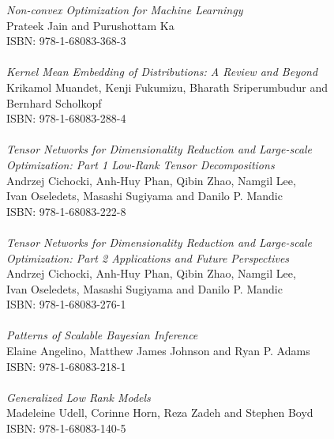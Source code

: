 \vspace{12pt}
\noindent \textit{Non-convex Optimization for Machine Learningy}\\
Prateek Jain and Purushottam Ka\\
ISBN: 978-1-68083-368-3\\
\\
\noindent \textit{Kernel Mean Embedding of Distributions: A Review and Beyond}\\
Krikamol Muandet, Kenji Fukumizu, Bharath Sriperumbudur and\\ Bernhard Scholkopf\\
ISBN: 978-1-68083-288-4\\
\\
\noindent \textit{Tensor Networks for Dimensionality Reduction and Large-scale\\ Optimization: Part 1 Low-Rank Tensor Decompositions}\\
Andrzej Cichocki, Anh-Huy Phan, Qibin Zhao, Namgil Lee,\\ Ivan Oseledets, Masashi Sugiyama and Danilo P. Mandic\\
ISBN: 978-1-68083-222-8\\
\\
\noindent \textit{Tensor Networks for Dimensionality Reduction and Large-scale\\ Optimization: Part 2 Applications and Future Perspectives}\\
Andrzej Cichocki, Anh-Huy Phan, Qibin Zhao, Namgil Lee,\\ Ivan Oseledets, Masashi Sugiyama and Danilo P. Mandic\\
ISBN: 978-1-68083-276-1\\
\\
\noindent \textit{Patterns of Scalable Bayesian Inference}\\
Elaine Angelino, Matthew James Johnson and Ryan P. Adams \\
ISBN: 978-1-68083-218-1\\
\\
\noindent \textit{Generalized Low Rank Models}\\
Madeleine Udell, Corinne Horn, Reza Zadeh and Stephen Boyd \\
ISBN: 978-1-68083-140-5
